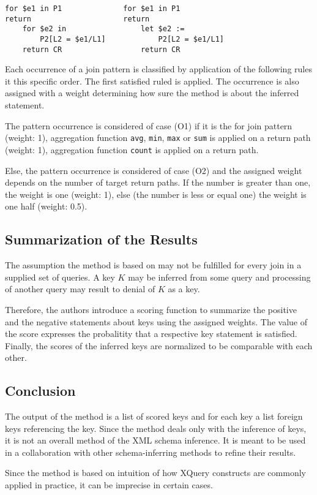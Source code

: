 \begin{verbatim}
for $e1 in P1              for $e1 in P1
return                     return
    for $e2 in                 let $e2 :=
        P2[L2 = $e1/L1]            P2[L2 = $e1/L1]
    return CR                  return CR
\end{verbatim}

Each occurrence of a join pattern is classified by application of the following rules it this specific order. The first satisfied ruled is applied. The occurrence is also assigned with a weight determining how sure the method is about the inferred statement.

The pattern occurrence is considered of case (O1) if it is the for join pattern (weight: 1), aggregation function \texttt{avg}, \texttt{min}, \texttt{max} or \texttt{sum} is applied on a return path (weight: 1), aggregation function \texttt{count} is applied on a return path. 

Else, the pattern occurrence is considered of case (O2) and the assigned weight depends on the number of target return paths. If the number is greater than one, the weight is one (weight: 1), else (the number is less or equal one) the weight is one half (weight: 0.5).

\subsection{Summarization of the Results}

The assumption the method is based on may not be fulfilled for every join in a supplied set of queries. A key $K$ may be inferred from some query and processing of another query may result to denial of $K$ as a key. 

Therefore, the authors introduce a scoring function to summarize the positive and the negative statements about keys using the assigned weights. The value of the score expresses the probalitity that a respective key statement is satisfied. Finally, the scores of the inferred keys are normalized to be comparable with each other.

\subsection{Conclusion}
The output of the method is a list of scored keys and for each key a list foreign keys referencing the key. Since the method deals only with the inference of keys, it is not an overall method of the XML schema inference. It is meant to be used in a collaboration with other schema-inferring methods to refine their results.

Since the method is based on intuition of how XQuery constructs are commonly applied in practice, it can be imprecise in certain cases.

